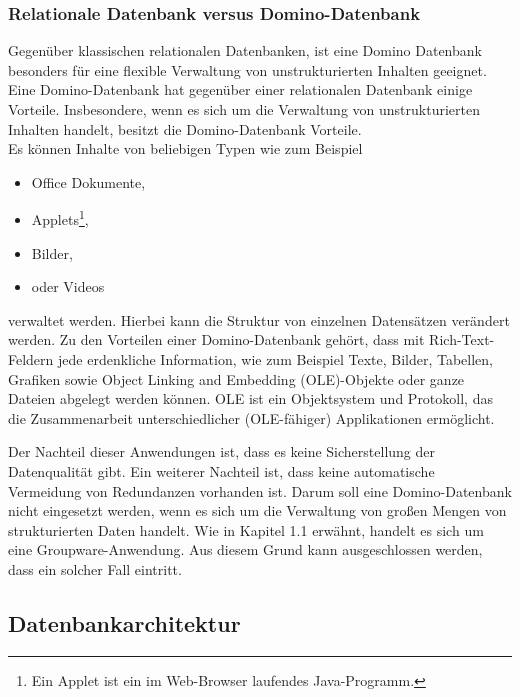 \subsubsection{Relationale Datenbank versus Domino-Datenbank}
\label{sec:3dominoDB}
Gegen\"uber klassischen relationalen Datenbanken, ist eine Domino Datenbank besonders f\"ur eine flexible Verwaltung von unstrukturierten Inhalten
geeignet.
Eine Domino-Datenbank hat gegenüber einer relationalen Datenbank einige Vorteile. Insbesondere, wenn es sich um die Verwaltung von unstrukturierten 
Inhalten handelt, besitzt die Domino-Datenbank Vorteile.\\
Es können Inhalte von beliebigen Typen wie zum Beispiel
\begin{itemize}
\item Office Dokumente,
\item Applets\footnote{Ein Applet ist ein im Web-Browser laufendes Java-Programm.},
\item Bilder,
\item oder Videos
\end{itemize}
verwaltet werden. Hierbei kann die Struktur von einzelnen Datensätzen verändert werden\cite{knaepper}. 
Zu den Vorteilen einer Domino-Datenbank gehört, dass mit Rich-Text-Feldern jede \linebreak erdenkliche Information, wie zum Beispiel
Texte, Bilder, Tabellen, Grafiken sowie Object \linebreak Linking and Embedding (OLE)-Objekte oder ganze Dateien abgelegt werden können.
OLE ist ein Objektsystem und Protokoll, das die Zusammenarbeit unterschiedlicher (OLE-fähiger) Applikationen ermöglicht\cite{ebel}. 

Der Nachteil dieser Anwendungen ist, dass es keine Sicherstellung der Datenqualität gibt. 
Ein weiterer Nachteil ist, dass keine automatische Vermeidung von Redundanzen \linebreak vorhanden ist. 
Darum soll eine Domino-Datenbank nicht eingesetzt werden, wenn es sich um die Verwaltung von großen Mengen von strukturierten Daten handelt. 
Wie in Kapitel 1.1 erwähnt, handelt es sich um eine Groupware-Anwendung. Aus diesem Grund kann ausgeschlossen \linebreak werden, dass ein 
solcher Fall eintritt\cite{knaepper}.\newline

\subsection{Datenbankarchitektur}
\label{sec:3dominoDB}

